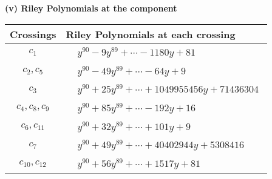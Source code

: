 \documentclass[1p]{elsarticle_modified}
\theoremstyle{definition}
\begin{document}
\newpage\renewcommand{\arraystretch}{1}
\flushleft \textbf{(v) Riley Polynomials at the component}\newline \\
\begin{tabular}{m{50pt}|m{274pt}}
Crossings & \hspace{64pt}Riley Polynomials at each crossing \\
\hline $$\begin{aligned}c_{1}\end{aligned}$$&$\begin{aligned}
&y^{90}-9 y^{89}+\cdots-1180 y+81
\end{aligned}$\\
\hline $$\begin{aligned}c_{2},c_{5}\end{aligned}$$&$\begin{aligned}
&y^{90}-49 y^{89}+\cdots-64 y+9
\end{aligned}$\\
\hline $$\begin{aligned}c_{3}\end{aligned}$$&$\begin{aligned}
&y^{90}+25 y^{89}+\cdots+1049955456 y+71436304
\end{aligned}$\\
\hline $$\begin{aligned}c_{4},c_{8},c_{9}\end{aligned}$$&$\begin{aligned}
&y^{90}+85 y^{89}+\cdots-192 y+16
\end{aligned}$\\
\hline $$\begin{aligned}c_{6},c_{11}\end{aligned}$$&$\begin{aligned}
&y^{90}+32 y^{89}+\cdots+101 y+9
\end{aligned}$\\
\hline $$\begin{aligned}c_{7}\end{aligned}$$&$\begin{aligned}
&y^{90}+49 y^{89}+\cdots+40402944 y+5308416
\end{aligned}$\\
\hline $$\begin{aligned}c_{10},c_{12}\end{aligned}$$&$\begin{aligned}
&y^{90}+56 y^{89}+\cdots+1517 y+81
\end{aligned}$\\
\hline
\end{tabular}\\~\\
\end{document}
